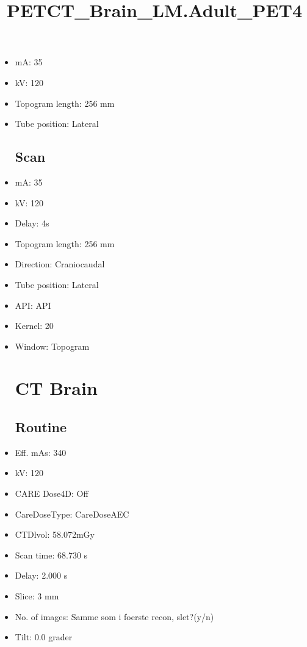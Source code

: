 \documentclass[12pt]{article}
\title{PETCT\_Brain\_LM.Adult\_PET4}
\begin{document}
\maketitle
\newpage
\tableofcontents
\newpage
{}


\begin{itemize}\section{Topogram}
\subsection{Routine}
\item mA: 35\item kV: 120\item Topogram length: 256 mm\item Tube position: Lateral
\subsection{Scan}\item mA: 35\item kV: 120\item Delay: 4s\item Topogram length: 256 mm\item Direction: Craniocaudal\item Tube position: Lateral\item API: API \item Kernel: 20\item Window: Topogram
\section{CT Brain}
\subsection{Routine}
\item Eff. mAs: 340\item kV: 120\item CARE Dose4D: Off\item CareDoseType: CareDoseAEC\item CTDlvol: 58.072mGy\item Scan time: 68.730 s\item Delay: 2.000 s\item Slice: 3 mm\item No. of images: Samme som i foerste recon, slet?(y/n)\item Tilt: 0.0 grader

\end{itemize}
\end{document}
